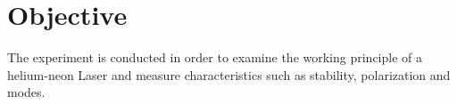 \section{Objective}
\label{sec:objective}
The experiment is conducted in order to examine the working principle of a helium-neon Laser and measure characteristics such as stability, polarization and modes.
